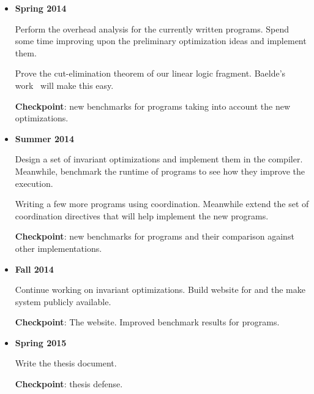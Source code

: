\begin{itemize}
   \item \textbf{Spring 2014}
      
   Perform the overhead analysis for the currently written \lang programs.
   Spend some time improving upon the preliminary optimization ideas and implement them.

   Prove the cut-elimination theorem of our linear logic fragment. Baelde's work~\cite{Baelde:2012:LGF:2071368.2071370} will make this easy.
   
   \textbf{Checkpoint}: new benchmarks for \lang programs taking into account the new optimizations.

   \item \textbf{Summer 2014}
   
   Design a set of invariant optimizations and implement them in the compiler. Meanwhile, benchmark the runtime of programs to see how they improve the execution.

   Writing a few more programs using coordination.
   Meanwhile extend the set of coordination directives that will help implement the new programs.

   \textbf{Checkpoint}: new benchmarks for \lang programs and their comparison against other implementations.
   
   \item \textbf{Fall 2014}
   
   Continue working on invariant optimizations.
   Build website for \lang and the make \lang system publicly available.
   
   \textbf{Checkpoint}: The \lang website. Improved benchmark results for \lang programs.
   
   \item \textbf{Spring 2015}
   
   Write the thesis document.
   
   \textbf{Checkpoint}: thesis defense.

\end{itemize}
